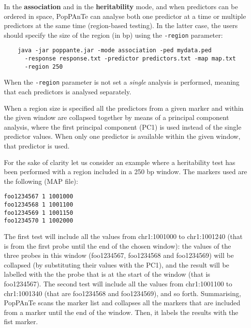 \documentclass[a4paper,9pt]{article}
\begin{document}
\noindent
In the \textbf{association} and in the \textbf{heritability} mode, and when predictors can be ordered in space, PopPAnTe can analyse both one predictor at a time or multiple predictors at the same time (region-based testing). In the latter case, the users should specify the size of the region (in bp) using the \texttt{-region} parameter:
 
\begin{Verbatim}
	java -jar poppante.jar -mode association -ped mydata.ped 
	  -response response.txt -predictor predictors.txt -map map.txt
	  -region 250
\end{Verbatim}

\noindent
When the \texttt{-region} parameter is not set a \emph{single} analysis is performed, meaning that each predictors is analysed separately.

\noindent
When a region size is specified all the predictors from a given marker and within the given window are collapsed together by means of a principal component analysis, where the first principal component (PC1) is used instead of the single predictor values. When only one predictor is available within the given window, that predictor is used.

\vspace{0.5cm}

\noindent
For the sake of clarity let us consider an example where a heritability test has been performed with a region included in a 250 bp window. The markers used are the following (MAP file):

\begin{Verbatim}
foo1234567 1 1001000
foo1234568 1 1001100
foo1234569 1 1001150
foo1234570 1 1002000 
\end{Verbatim}

\noindent
The first test will include all the values from chr1:1001000 to chr1:1001240 (that is from the first probe until the end of the chosen window): the values of the three probes in this window (foo1234567, foo1234568 and foo1234569) will be collapsed (by substituting their values with the PC1), and the result will be labelled with the the probe that is at the start of the window (that is foo1234567).
The second test will include all the values from chr1:1001100 to chr1:1001340 (that are foo1234568 and foo1234569), and so forth.
Summarising, PopPAnTe scans the marker list and collapses all the markers that are included from a marker until the end of the window. Then, it labels the results with the fist marker. 
 
\end{document}

